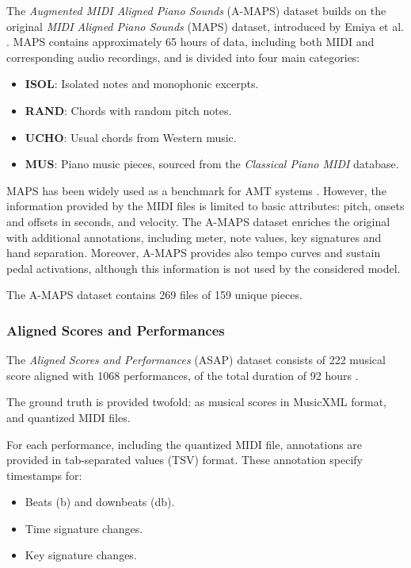 The \emph{Augmented MIDI Aligned Piano Sounds} (A-MAPS) dataset builds on the original \emph{MIDI Aligned Piano Sounds} (MAPS) dataset, introduced by Emiya et al. \cite{Emiya2010}. MAPS contains approximately 65 hours of data, including both MIDI and corresponding audio recordings, and is divided into four main categories:\begin{itemize}
	\item \textbf{ISOL}: Isolated notes and monophonic excerpts.
	\item \textbf{RAND}: Chords with random pitch notes.
	\item \textbf{UCHO}: Usual chords from Western music.
	\item \textbf{MUS}: Piano music pieces, sourced from the \emph{Classical Piano MIDI} database. \end{itemize}

MAPS has been widely used as a benchmark for AMT systems \cite{Ycart2018}. However, the information provided by the MIDI files is limited to basic attributes: pitch, onsets and offsets in seconds, and velocity. The A-MAPS dataset enriches the original with additional annotations, including meter, note values, key signatures and hand separation. Moreover, A-MAPS provides also tempo curves and sustain pedal activations, although this information is not used by the considered model.

The A-MAPS dataset contains 269 files of 159 unique pieces.

\subsubsection{Aligned Scores and Performances}

The \emph{Aligned Scores and Performances} (ASAP) dataset consists of 222 musical score aligned with 1068 performances, of the total duration of 92 hours \cite{Foscarin2020}.

The ground truth is provided twofold: as musical scores in MusicXML format, and quantized MIDI files.

For each performance, including the quantized MIDI file, annotations are provided in tab-separated values (TSV) format. These annotation specify timestamps for: \begin{itemize}
	\item Beats (b) and downbeats (db).
	\item Time signature changes.
	\item Key signature changes.
\end{itemize}

